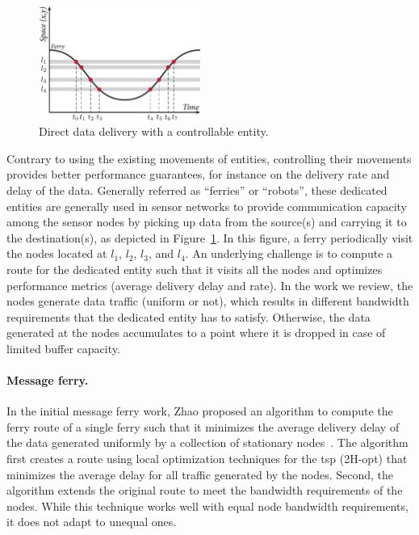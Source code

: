 \begin{figure}
    \includegraphics[width=5.3cm]{figures/dtn-direct-controlled-forwarding.pdf}
    \caption{Direct data delivery with a controllable entity.}
    \label{fig:dtn-direct-controlled-forwarding}
\end{figure}
Contrary to using the existing movements of entities, controlling their movements provides better performance guarantees, for instance on the delivery rate and delay of the data. Generally referred as ``ferries'' or ``robots'', these dedicated entities are generally used in sensor networks to provide communication capacity among the sensor nodes by picking up data from the source(s) and carrying it to the destination(s), as depicted in Figure~\ref{fig:dtn-direct-controlled-forwarding}. In this figure, a ferry periodically visit the nodes located at $l_1$, $l_2$, $l_3$, and $l_4$. An underlying challenge is to compute a route for the dedicated entity such that it visits all the nodes and optimizes performance metrics (\eg average delivery delay and rate). In the work we review, the nodes generate data traffic (uniform or not), which results in different bandwidth requirements that the dedicated entity has to satisfy. Otherwise, the data generated at the nodes accumulates to a point where it is dropped in case of limited buffer capacity.

\paragraph{Message ferry.}
In the initial message ferry work, Zhao \etal proposed an algorithm to compute the ferry route of a single ferry such that it minimizes the average delivery delay of the data generated uniformly by a collection of stationary nodes~\cite{zhao2003message}. The algorithm first creates a route using local optimization techniques for the \acrfull{tsp} (2H-opt) that minimizes the average delay for all traffic generated by the nodes. Second, the algorithm extends the original route to meet the bandwidth requirements of the nodes. While this technique works well with equal node bandwidth requirements, it does not adapt to unequal ones. 

